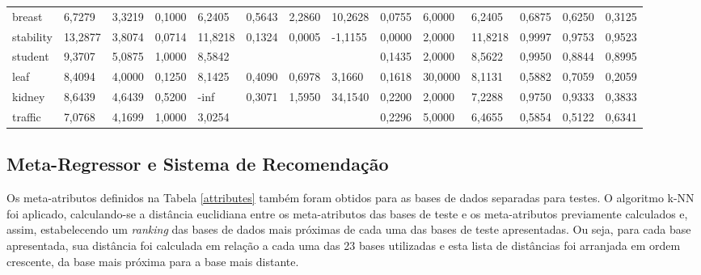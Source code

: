 \documentclass[runningheads]{llncs}
\begin{document}
\begin{table}[ht]
\begin{adjustbox}{width=1\textwidth}
\begin{tabular}{|l|l|l|l|l|l|l|l|l|l|l|l|l|l|}
breast     & 6,7279   & 3,3219     & 0,1000          & 6,2405        & 0,5643            & 2,2860     & 10,2628        & 0,0755   & 6,0000  & 6,2405  & 0,6875         & 0,6250          & 0,3125           \\
stability  & 13,2877  & 3,8074     & 0,0714          & 11,8218       & 0,1324            & 0,0005     & -1,1155        & 0,0000   & 2,0000  & 11,8218 & 0,9997         & 0,9753          & 0,9523           \\
student    & 9,3707   & 5,0875     & 1,0000          & 8,5842        &                   &            &                & 0,1435   & 2,0000  & 8,5622  & 0,9950         & 0,8844          & 0,8995           \\
leaf       & 8,4094   & 4,0000     & 0,1250          & 8,1425        & 0,4090            & 0,6978     & 3,1660         & 0,1618   & 30,0000 & 8,1131  & 0,5882         & 0,7059          & 0,2059           \\
kidney     & 8,6439   & 4,6439     & 0,5200          & -inf          & 0,3071            & 1,5950     & 34,1540        & 0,2200   & 2,0000  & 7,2288  & 0,9750         & 0,9333          & 0,3833           \\
traffic    & 7,0768   & 4,1699     & 1,0000          & 3,0254        &                   &            &                & 0,2296   & 5,0000  & 6,4655  & 0,5854         & 0,5122          & 0,6341           \\ \hline
\end{tabular}
\end{adjustbox}
\end{table}

\subsection{Meta-Regressor e Sistema de Recomendação}

Os meta-atributos definidos na Tabela \ref{attributes} também foram obtidos para as bases de dados separadas para testes. O algoritmo k-NN foi aplicado, calculando-se a distância euclidiana entre os meta-atributos das bases de teste e os meta-atributos previamente calculados e, assim, estabelecendo um \emph{ranking} das bases de dados mais próximas de cada uma das bases de teste apresentadas. Ou seja, para cada base apresentada, sua distância foi calculada em relação a cada uma das 23 bases utilizadas e esta lista de distâncias foi arranjada em ordem crescente, da base mais próxima para a base mais distante. 
\end{document}
